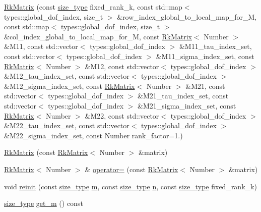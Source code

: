 \begin{DoxyCompactItemize}
\hyperlink{classRkMatrix_a00a2465dfb9445dca842f19fc757d008}{Rk\+Matrix} (const \hyperlink{classRkMatrix_add060bfc3a4cc77f858c3d6dd58cadd5}{size\+\_\+type} fixed\+\_\+rank\+\_\+k, const std\+::map$<$ types\+::global\+\_\+dof\+\_\+index, size\+\_\+t $>$ \&row\+\_\+index\+\_\+global\+\_\+to\+\_\+local\+\_\+map\+\_\+for\+\_\+M, const std\+::map$<$ types\+::global\+\_\+dof\+\_\+index, size\+\_\+t $>$ \&col\+\_\+index\+\_\+global\+\_\+to\+\_\+local\+\_\+map\+\_\+for\+\_\+M, const \hyperlink{classRkMatrix}{Rk\+Matrix}$<$ Number $>$ \&M11, const std\+::vector$<$ types\+::global\+\_\+dof\+\_\+index $>$ \&M11\+\_\+tau\+\_\+index\+\_\+set, const std\+::vector$<$ types\+::global\+\_\+dof\+\_\+index $>$ \&M11\+\_\+sigma\+\_\+index\+\_\+set, const \hyperlink{classRkMatrix}{Rk\+Matrix}$<$ Number $>$ \&M12, const std\+::vector$<$ types\+::global\+\_\+dof\+\_\+index $>$ \&M12\+\_\+tau\+\_\+index\+\_\+set, const std\+::vector$<$ types\+::global\+\_\+dof\+\_\+index $>$ \&M12\+\_\+sigma\+\_\+index\+\_\+set, const \hyperlink{classRkMatrix}{Rk\+Matrix}$<$ Number $>$ \&M21, const std\+::vector$<$ types\+::global\+\_\+dof\+\_\+index $>$ \&M21\+\_\+tau\+\_\+index\+\_\+set, const std\+::vector$<$ types\+::global\+\_\+dof\+\_\+index $>$ \&M21\+\_\+sigma\+\_\+index\+\_\+set, const \hyperlink{classRkMatrix}{Rk\+Matrix}$<$ Number $>$ \&M22, const std\+::vector$<$ types\+::global\+\_\+dof\+\_\+index $>$ \&M22\+\_\+tau\+\_\+index\+\_\+set, const std\+::vector$<$ types\+::global\+\_\+dof\+\_\+index $>$ \&M22\+\_\+sigma\+\_\+index\+\_\+set, const Number rank\+\_\+factor=1.)
\item 
\hyperlink{classRkMatrix_a5f886128ba604cc85f99e3c9c9a07e7c}{Rk\+Matrix} (const \hyperlink{classRkMatrix}{Rk\+Matrix}$<$ Number $>$ \&matrix)
\item 
\hyperlink{classRkMatrix}{Rk\+Matrix}$<$ Number $>$ \& \hyperlink{classRkMatrix_a8894542d0a6cda34a78cccf34eb3f990}{operator=} (const \hyperlink{classRkMatrix}{Rk\+Matrix}$<$ Number $>$ \&matrix)
\item 
void \hyperlink{classRkMatrix_a5457372194e8009bffc7b88f11b95d03}{reinit} (const \hyperlink{classRkMatrix_add060bfc3a4cc77f858c3d6dd58cadd5}{size\+\_\+type} \hyperlink{classRkMatrix_a8ca8898bcfedeee135437833f83b144c}{m}, const \hyperlink{classRkMatrix_add060bfc3a4cc77f858c3d6dd58cadd5}{size\+\_\+type} \hyperlink{classRkMatrix_a06d3b6636bb423c391c66e4ccc722687}{n}, const \hyperlink{classRkMatrix_add060bfc3a4cc77f858c3d6dd58cadd5}{size\+\_\+type} fixed\+\_\+rank\+\_\+k)
\item 
\hyperlink{classRkMatrix_add060bfc3a4cc77f858c3d6dd58cadd5}{size\+\_\+type} \hyperlink{classRkMatrix_a58686c65ca8c952558eae4fa185e7d6a}{get\+\_\+m} () const

\end{DoxyCompactItemize}
